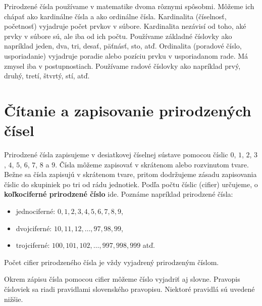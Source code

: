 \documentclass{report}
\begin{document}
Prirodzené čísla používame v matematike dvoma rôznymi spôsobmi. Môžeme ich chápať ako kardinálne čísla a ako ordinálne čísla. Kardinalita (číselnosť, početnosť) vyjadruje počet prvkov v súbore. Kardinalita nezávisí od toho, aké prvky v súbore sú, ale iba od ich počtu. Používame základné číslovky ako napríklad jeden, dva, tri, desať, päťnásť, sto, atď. Ordinalita (poradové číslo, usporiadanie) vyjadruje poradie alebo pozíciu prvku v usporiadanom rade. Má zmysel iba v postupnostiach. Používame radové číslovky ako napríklad prvý, druhý, tretí, štvrtý, stí, atď.

\section{Čítanie a zapisovanie prirodzených čísel}

Prirodzené čísla zapisujeme v desiatkovej číselnej sústave pomocou číslic \(0\), \(1\), \(2\), \(3\), \(4\), \(5\), \(6\), \(7\), \(8\) a \(9\). Čísla môžeme zapisovať v skrátenom alebo rozvinutom tvare. Bežne sa čísla zapisujú v skrátenom tvare, pritom dodržujeme zásadu zapisovania číslic do skupiniek po tri od rádu jednotiek. Podľa počtu číslic (cifier) určujeme, o \textbf{koľkociferné prirodzené číslo} ide. Poznáme napríklad prirodzené čísla:
\begin{itemize}
  \item jednociferné: \(0, 1, 2, 3, 4, 5, 6, 7, 8, 9\),
  \item dvojciferné: \(10, 11, 12, \dots, 97, 98, 99\),
  \item trojciferné: \(100, 101, 102, \dots, 997, 998, 999\) atď.
\end{itemize}
Počet cifier prirodzeného čísla je vždy vyjadrený prirodzeným číslom.

Okrem zápisu čísla pomocou cifier môžeme číslo vyjadriť aj slovne. Pravopis čísloviek sa riadi pravidlami slovenského pravopisu. Niektoré pravidlá sú uvedené nižšie.
\end{document}
